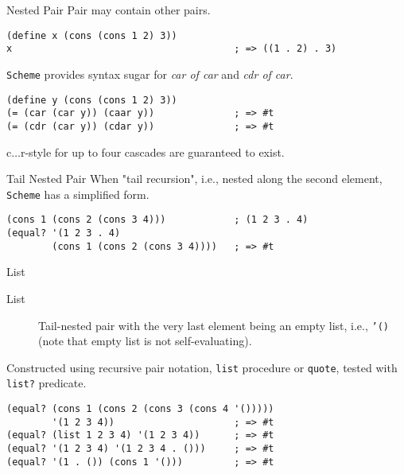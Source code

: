 \documentclass[presentation]{beamer}
\begin{document}
\begin{frame}[fragile,label={sec:orgheadline33}]{Nested Pair}
 Pair may contain other pairs.

\begin{verbatim}
(define x (cons (cons 1 2) 3))
x                                       ; => ((1 . 2) . 3)
\end{verbatim}

\texttt{Scheme} provides syntax sugar for \emph{car of car} and \emph{cdr of car}.

\begin{verbatim}
(define y (cons (cons 1 2) 3))
(= (car (car y)) (caar y))              ; => #t
(= (cdr (car y)) (cdar y))              ; => #t
\end{verbatim}

c\(\dots\)r-style for up to four cascades are guaranteed to exist.
\end{frame}

\begin{frame}[fragile,label={sec:orgheadline34}]{Tail Nested Pair}
 When "tail recursion", i.e., nested along the second element,
\texttt{Scheme} has a simplified form.

\begin{verbatim}
(cons 1 (cons 2 (cons 3 4)))            ; (1 2 3 . 4)
(equal? '(1 2 3 . 4)
        (cons 1 (cons 2 (cons 3 4))))   ; => #t
\end{verbatim}
\end{frame}

\begin{frame}[fragile,label={sec:orgheadline35}]{List}
 \begin{description}
\item[{List}] Tail-nested pair with the very last element being an
empty list, i.e., \texttt{​'()} (note that empty list is not
self-evaluating).
\end{description}


Constructed using recursive pair notation, \texttt{list} procedure or
\texttt{quote}, tested with \texttt{list?} predicate.

\begin{verbatim}
(equal? (cons 1 (cons 2 (cons 3 (cons 4 '()))))
        '(1 2 3 4))                     ; => #t
(equal? (list 1 2 3 4) '(1 2 3 4))      ; => #t
(equal? '(1 2 3 4) '(1 2 3 4 . ()))     ; => #t
(equal? '(1 . ()) (cons 1 '()))         ; => #t
\end{verbatim}
\end{frame}
\end{document}
